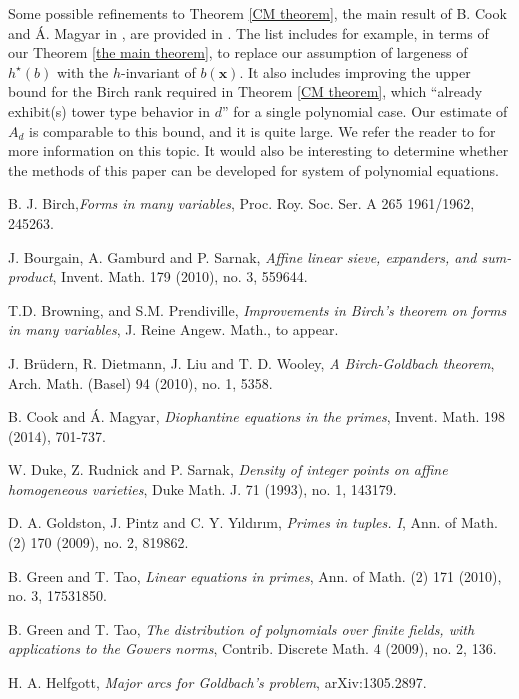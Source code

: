 \documentclass[12pt]{amsart}
\theoremstyle{definition}
\theoremstyle{remark}
\numberwithin{equation}{section}
\begin{document}
Some possible refinements to Theorem \ref{CM theorem}, the main result of B. Cook and \'{A}. Magyar in \cite{CM},
are provided in \cite[Section 8]{CM}. The list includes for example, in terms of our Theorem \ref{the main theorem}, to replace our assumption of largeness of $h^{\star}(b)$ with the $h$-invariant of $b(\mathbf{x})$. It also includes improving the upper bound for the Birch rank required in Theorem \ref{CM theorem}, which ``already exhibit(s) tower type behavior in $d$'' \cite{CM} for a single polynomial case. Our estimate of $A_d$ is comparable to this bound, and it is quite large. We refer the reader to \cite[Section 8]{CM} for more information on this topic. It would also be interesting to determine whether the methods of this
paper can be developed for system of polynomial equations.
\begin{thebibliography}{9}

  B. J. Birch,\textit{Forms in many variables}, Proc. Roy. Soc. Ser. A 265 1961/1962, 245263.

 J. Bourgain, A. Gamburd and P. Sarnak, \textit{Affine linear sieve, expanders, and sum-product}, Invent. Math. 179 (2010), no. 3, 559644.

 T.D. Browning, and S.M. Prendiville, \textit{Improvements in Birch's theorem on forms in many variables},
J. Reine Angew. Math., to appear.

 J. Br\"{u}dern, R. Dietmann, J. Liu and T. D. Wooley,
\textit{A Birch-Goldbach theorem}, Arch. Math. (Basel) 94 (2010), no. 1, 5358.

 B. Cook and {\'A}.  Magyar, \textit{Diophantine equations in the primes},
Invent. Math. {198} (2014), 701-737.

 W. Duke, Z. Rudnick and P. Sarnak, \textit{Density of integer points on affine homogeneous varieties}, Duke Math. J. 71 (1993), no. 1, 143179.

  D. A. Goldston,  J. Pintz and  C. Y. Y{\i}ld{\i}r{\i}m, \textit{Primes in tuples. I}, Ann. of Math. (2) 170 (2009), no. 2, 819862.

 B. Green and  T. Tao, \textit{Linear equations in primes}, Ann. of Math. (2) 171 (2010), no. 3, 17531850.

 B. Green and  T. Tao, \textit{The distribution of polynomials over finite fields, with applications to the Gowers norms}, Contrib. Discrete Math. 4 (2009), no. 2, 136.

 H. A. Helfgott, \textit{Major arcs for Goldbach's problem}, arXiv:1305.2897.


\end{thebibliography}
\end{document}
